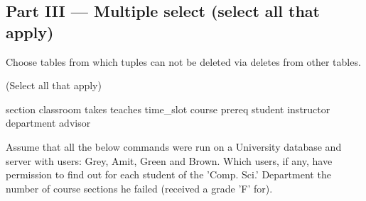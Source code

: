 \documentclass[12pt, addpoints]{exam}
\begin{document}
\begin{questions}
\section*{Part III — Multiple select (select all that apply)}

\begin{minipage}{\linewidth}
\question[4]
Choose tables from which tuples can not be deleted via deletes from other tables.\par\vspace{0.5em}
(Select all that apply)\par\vspace{0.5em}
\begin{checkboxes}
    \choice section
    \CorrectChoice classroom
    \choice takes
    \choice teaches
    \CorrectChoice time\_slot
    \CorrectChoice course
    \choice prereq
    \CorrectChoice student
    \CorrectChoice instructor
    \CorrectChoice department
    \choice advisor
\end{checkboxes}
\end{minipage}

\begin{minipage}{\linewidth}
\question[4]
Assume that all the below commands were run on a University database and server with users: Grey, Amit, Green and Brown. 
Which users, if any, have permission to find out for each student of the 'Comp. Sci.' 
Department the number of course sections he failed (received a grade 'F' for).\par\vspace{0.5em}


\end{minipage}
\end{questions}
\end{document}
